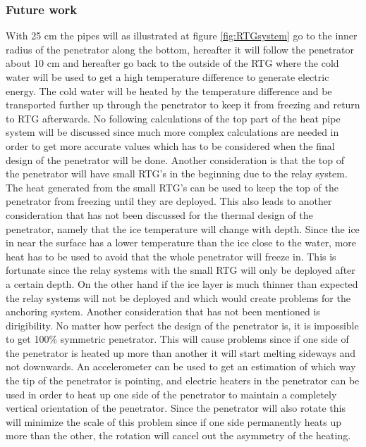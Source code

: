 \subsubsection{Future work}
With 25 cm the pipes will as illustrated at figure \ref{fig:RTGsystem} go to the inner radius of the penetrator along the bottom, hereafter it will follow the penetrator about 10 cm and hereafter go back to the outside of the RTG where the cold water will be used to get a high temperature difference to generate electric energy. The cold water will be heated by the temperature difference and be transported further up through the penetrator to keep it from freezing and return to RTG afterwards. No following calculations of the top part of the heat pipe system will be discussed since much more complex calculations are needed in order to get more accurate values which has to be considered when the final design of the penetrator will be done. Another consideration is that the top of the penetrator will have small RTG's in the beginning due to the relay system. The heat generated from the small RTG's can be used to keep the top of the penetrator from freezing until they are deployed. This also leads to another consideration that has not been discussed for the thermal design of the penetrator, namely that the ice temperature will change with depth. Since the ice in near the surface has a lower temperature than the ice close to the water, more heat has to be used to avoid that the whole penetrator will freeze in. This is fortunate since the relay systems with the small RTG will only be deployed after a certain depth. On the other hand if the ice layer is much thinner than expected the relay systems will not be deployed and which would create problems for the anchoring system. Another consideration that has not been mentioned is dirigibility. No matter how perfect the design of the penetrator is, it is impossible to get 100\% symmetric penetrator. This will cause problems since if one side of the penetrator is heated up more than another it will start melting sideways and not downwards. An accelerometer can be used to get an estimation of which way the tip of the penetrator is pointing, and electric heaters in the penetrator can be used in order to heat up one side of the penetrator to maintain a completely vertical orientation of the penetrator. Since the penetrator will also rotate this will minimize the scale of this problem since if one side permanently heats up more than the other, the rotation will cancel out the asymmetry of the heating.\\
 
